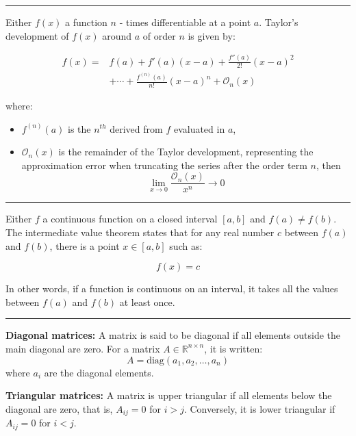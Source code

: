 \hrule
\begin{f}
 
Either \( f(x) \) a function \( n \) - times differentiable at a point \( a \). Taylor's development of \( f(x) \) around \( a \) of order \(n\) is given by:

\begin{align*}
 f(x) =& f(a) + f'(a)(x - a) + \frac{f''(a)}{2!}(x - a)^2 \\
 &+ \cdots + \frac{f^{(n)}(a)}{n!}(x - a)^n + \mathcal{O}_n(x)
\end{align*}


where:
\begin{itemize}
    \item \( f^{(n)}(a) \) is the \( n^{th} \) derived from \( f \) evaluated in \( a \),
    \item \( \mathcal{O}_n(x) \) is the remainder of the Taylor development, representing the approximation error when truncating the series after the order term \( n \), then 
    \[
    \lim_{x\rightarrow 0}\frac{\mathcal{O}_n(x) }{x^n}\to 0
    \]
\end{itemize}
\end{f}
\hrule
\begin{f} 

Either \( f \) a continuous function on a closed interval \([a, b]\) and \( f(a) \neq f(b) \). The intermediate value theorem states that for any real number \( c \) between \( f(a) \) and \( f(b) \), there is a point \( x \in [a, b] \) such as:

\[
f(x) = c
\]

In other words, if a function is continuous on an interval, it takes all the values between \( f(a) \) and \( f(b) \) at least once.
\end{f}
\hrule
\begin{f}
  
\textbf{Diagonal matrices:}
A matrix is said to be diagonal if all elements outside the main diagonal are zero. For a matrix \( A \in \mathbb{R}^{n \times n} \), it is written:
\[
A = \text{diag}(a_1, a_2, \dots, a_n)
\]
where \( a_i \) are the diagonal elements.

\textbf{Triangular matrices:}
A matrix is upper triangular if all elements below the diagonal are zero, that is, \( A_{ij} = 0 \) for \( i > j \). Conversely, it is lower triangular if \( A_{ij} = 0 \) for \( i < j \).
\end{f}
